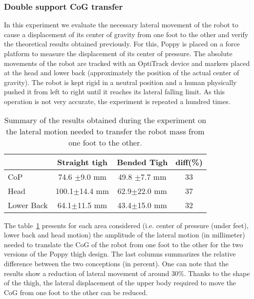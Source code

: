 \subsubsection{Double support CoG transfer} %
\label{sub:cog_motion}


In this experiment we evaluate the necessary lateral movement of the robot to cause a displacement of its center of gravity from one foot to the other and verify the theoretical results obtained previously. For this, Poppy is placed on a force platform to measure the displacement of its center of pressure. The absolute movements of the robot are tracked with an OptiTrack device and markers placed at the head and lower back (approximately the position of the actual center of gravity). The robot is kept rigid in a neutral position and a human physically pushed it from left to right until it reaches its lateral falling limit. As this operation is not very accurate, the experiment is repeated a hundred times.

\begin{table}[h]
\centering
\begin{tabular}{|l|c|c|c|}
  \hline &      Straight tigh &                     Bended Tigh &                   diff(\%) \\
  \hline CoP & 74.6 {\scriptsize$\pm$9.0} mm &     49.8 {\scriptsize$\pm$7.7} mm & 33\\
  Head & 100.1{\scriptsize$\pm$14.4} mm&     62.9{\scriptsize$\pm$22.0} mm &  37\\
  Lower Back & 64.1{\scriptsize$\pm$11.5} mm&      43.4{\scriptsize$\pm$15.0} mm &  32 \\
  \hline
\end{tabular}
\caption{Summary of the results obtained during the experiment on the lateral motion needed to transfer the robot mass from one foot to the other.}
\label{tab:CoG_motion}
\end{table}

The table~\ref{tab:CoG_motion} presents for each area considered (i.e. center of pressure (under feet), lower back and head motion) the amplitude of the lateral motion (in millimeter) needed to translate the CoG of the robot from one foot to the other for the two versions of the Poppy thigh design. The last columns summarizes the relative difference between the two conceptions (in percent). One can note that the results show a reduction of lateral movement of around 30\%. Thanks to the shape of the thigh, the lateral displacement of the upper body required to move the CoG from one foot to the other can be reduced.


